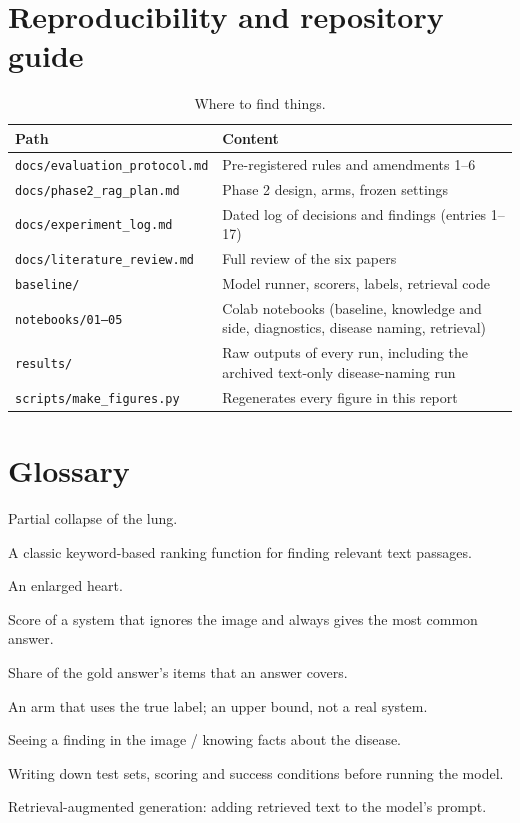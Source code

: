 \documentclass[11pt,a4paper]{article}
\begin{document}
\appendix
\section{Reproducibility and repository guide}\label{sec:repro}
\begin{table}[H]
\centering
\small
\begin{tabularx}{\linewidth}{@{}lX@{}}
\toprule
Path & Content \\
\midrule
\texttt{docs/evaluation\_protocol.md} & Pre-registered rules and amendments 1--6 \\
\texttt{docs/phase2\_rag\_plan.md} & Phase 2 design, arms, frozen settings \\
\texttt{docs/experiment\_log.md} & Dated log of decisions and findings (entries 1--17) \\
\texttt{docs/literature\_review.md} & Full review of the six papers \\
\texttt{baseline/} & Model runner, scorers, labels, retrieval code \\
\texttt{notebooks/01--05} & Colab notebooks (baseline, knowledge and side, diagnostics, disease naming, retrieval) \\
\texttt{results/} & Raw outputs of every run, including the archived text-only disease-naming run \\
\texttt{scripts/make\_figures.py} & Regenerates every figure in this report \\
\bottomrule
\end{tabularx}
\caption{Where to find things.}
\end{table}

\section{Glossary}
\begin{description}[style=nextline]
\item[Atelectasis] Partial collapse of the lung.
\item[BM25] A classic keyword-based ranking function for finding relevant text passages.
\item[Cardiomegaly] An enlarged heart.
\item[Constant-answer floor] Score of a system that ignores the image and always gives the most common answer.
\item[Item recall] Share of the gold answer's items that an answer covers.
\item[Oracle] An arm that uses the true label; an upper bound, not a real system.
\item[Perception / knowledge] Seeing a finding in the image / knowing facts about the disease.
\item[Pre-registration] Writing down test sets, scoring and success conditions before running the model.
\item[RAG] Retrieval-augmented generation: adding retrieved text to the model's prompt.
\end{description}
\end{document}
